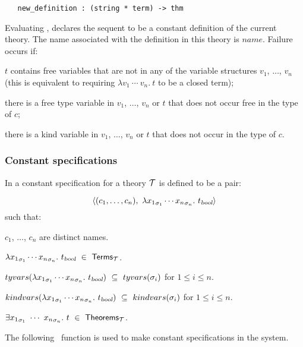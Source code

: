 \begin{holboxed}
\begin{verbatim}
   new_definition : (string * term) -> thm
\end{verbatim}
\end{holboxed}


\noindent Evaluating
 ,
declares the sequent
 to be a constant definition
of the current theory. The name associated with the definition in
this theory is $name$.
Failure occurs if:
\begin{myenumerate}
\item $t$ contains free variables that are not in any of
the variable structures $v_1$, $\dots$, $v_n$ (this is equivalent
to requiring $\lambda v_1\ \cdots\ v_n.\  t$ to be a closed term);
\item there is a free type variable in  $v_1$, $\dots$, $v_n$ or $t$
that does not occur free in the type of $c$;
\item there is a kind variable in  $v_1$, $\dots$, $v_n$ or $t$
that does not occur in the type of $c$.
\end{myenumerate}

\subsubsection{Constant specifications}
\label{conspec}

%
%
In \LOGIC{} a constant specification for a theory ${\cal T}$
is defined to be a pair:

\[
\langle(c_1,\ldots,c_n),\ \lquant{{x_1}_{\sigma_1}
\cdots {x_n}_{\sigma_n}}t_{\ty{bool}}\rangle
\]
such that:

\begin{myenumerate}
\item $c_1$, $\dots$, $c_n$ are distinct names.
\item $\lambda {x_1}_{\sigma_1}
\cdots {x_n}_{\sigma_n}.\ t_{\textsl{bool}}\ \in\ {\sf Terms}_{\cal T}$.
\item $tyvars(\lquant{{x_1}_{\sigma_1}
\cdots {x_n}_{\sigma_n}}t_{\ty{bool}})\ \subseteq\ tyvars(\sigma_i)$ for
$1\leq i\leq n$.
\item $kindvars(\lquant{{x_1}_{\sigma_1}
\cdots {x_n}_{\sigma_n}}t_{\ty{bool}})\ \subseteq\ kindvars(\sigma_i)$ for
$1\leq i\leq n$.
\item $\equant{{x_1}_{\sigma_1}\ \cdots\ {x_n}_{\sigma_n}}t
\ \in\ {\sf Theorems}_{\cal T}$.
\end{myenumerate}
The following \ML\ function is used to make constant specifications in
the \HOL{} system.

